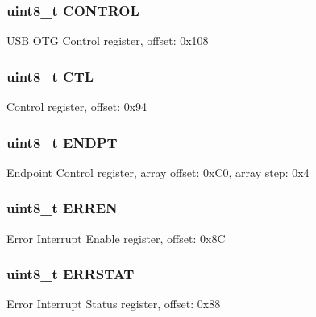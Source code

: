 \subsubsection[{C\+O\+N\+T\+R\+O\+L}]{\setlength{\rightskip}{0pt plus 5cm}uint8\+\_\+t C\+O\+N\+T\+R\+O\+L}\label{struct_u_s_b___mem_map_a07245e0c99405baca05af69e6890b05b}
U\+S\+B O\+T\+G Control register, offset\+: 0x108 \hypertarget{struct_u_s_b___mem_map_ad138b7e78dbe9f8cfa0992fbcf3a4fe6}{}
\subsubsection[{C\+T\+L}]{\setlength{\rightskip}{0pt plus 5cm}uint8\+\_\+t C\+T\+L}\label{struct_u_s_b___mem_map_ad138b7e78dbe9f8cfa0992fbcf3a4fe6}
Control register, offset\+: 0x94 \hypertarget{struct_u_s_b___mem_map_af33d61de8943ea382606eeef78e16800}{}
\subsubsection[{E\+N\+D\+P\+T}]{\setlength{\rightskip}{0pt plus 5cm}uint8\+\_\+t E\+N\+D\+P\+T}\label{struct_u_s_b___mem_map_af33d61de8943ea382606eeef78e16800}
Endpoint Control register, array offset\+: 0x\+C0, array step\+: 0x4 \hypertarget{struct_u_s_b___mem_map_aeb7e65b1b97a537240956a7f7b1a99bf}{}
\subsubsection[{E\+R\+R\+E\+N}]{\setlength{\rightskip}{0pt plus 5cm}uint8\+\_\+t E\+R\+R\+E\+N}\label{struct_u_s_b___mem_map_aeb7e65b1b97a537240956a7f7b1a99bf}
Error Interrupt Enable register, offset\+: 0x8\+C \hypertarget{struct_u_s_b___mem_map_a6c5912b64c4f9c6ea6bc484cfa4aeb46}{}
\subsubsection[{E\+R\+R\+S\+T\+A\+T}]{\setlength{\rightskip}{0pt plus 5cm}uint8\+\_\+t E\+R\+R\+S\+T\+A\+T}\label{struct_u_s_b___mem_map_a6c5912b64c4f9c6ea6bc484cfa4aeb46}
Error Interrupt Status register, offset\+: 0x88 \hypertarget{struct_u_s_b___mem_map_a7a6da4448f48d914ac3eb2fa20fd01dc}{}
